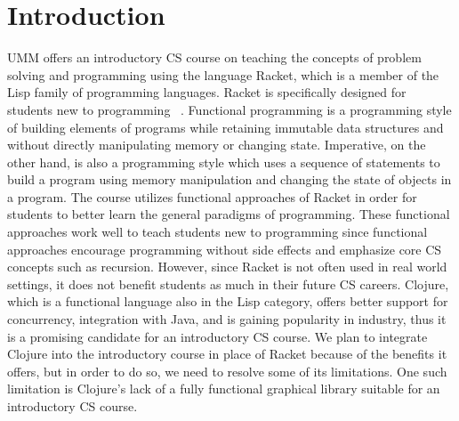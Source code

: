 \documentclass[12pt]{article}
\newcommand{\comment}[1]{{\bf \tt  {#1}}}
\newcommand{\emcomment}[1]{\textcolor{ForestGreen}{\comment{Elena: {#1}}}}
\newcommand{\todo}[1]{\textcolor{blue}{\comment{To Do: {#1}}}}
\begin{document}
\newpage
\setcounter{page}{1}

\section{Introduction}\label{sec:intro}
UMM offers an introductory CS course on teaching the concepts of problem solving and programming using the language Racket, which is a member of the Lisp family of programming languages. Racket is specifically designed for students new to programming ~\cite{htdp}. Functional programming is a programming style of building elements of programs while retaining immutable data structures 
and without directly manipulating memory or changing state. Imperative, on the other hand, is also a programming style which uses a sequence of statements to build a program using memory manipulation and changing the state of objects in a program. 
The course utilizes functional approaches of Racket in order for students to better learn the general paradigms of programming. These functional approaches work well to teach students new to programming since functional approaches encourage programming without side effects and emphasize core CS concepts such as recursion. However, since Racket is not often used in real world settings, it does not benefit students as much in their future CS careers. Clojure, which is a functional language also in the Lisp category, offers better support for concurrency, integration with Java, and is gaining popularity in industry, thus it  is a promising candidate for an introductory CS course.  We plan to integrate Clojure into the introductory course in place of Racket because of the benefits it offers, but in order to do so, we need to resolve some of its limitations. One such limitation is Clojure's lack of a fully functional graphical library suitable for an introductory CS course. 
\end{document}
